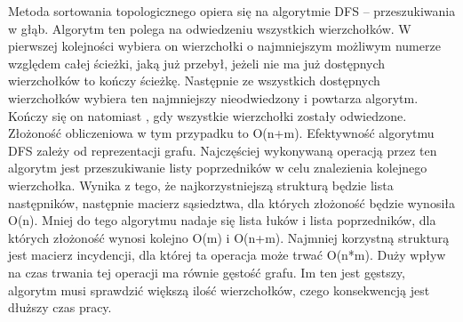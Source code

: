 \documentclass[polish,polish,a4paper]{article}
\begin{document}
\begin{spacing}{1.25}
	\begin{figure}[H]
	
		\centering
	\end{figure}

		
Metoda sortowania topologicznego opiera się na algorytmie DFS – przeszukiwania w głąb. Algorytm ten polega na odwiedzeniu wszystkich wierzchołków. W pierwszej kolejności wybiera on wierzchołki o najmniejszym możliwym numerze względem całej ścieżki, jaką już przebył, jeżeli nie ma już dostępnych wierzchołków to kończy ścieżkę. Następnie ze wszystkich dostępnych wierzchołków wybiera ten najmniejszy nieodwiedzony i powtarza algorytm. Kończy się on natomiast , gdy wszystkie wierzchołki zostały odwiedzone. Złożoność obliczeniowa w tym przypadku to O(n+m). Efektywność algorytmu DFS zależy od reprezentacji grafu. Najczęściej wykonywaną operacją przez ten algorytm jest przeszukiwanie listy poprzedników w celu znalezienia kolejnego wierzchołka. Wynika z tego, że najkorzystniejszą strukturą będzie lista następników, następnie macierz sąsiedztwa, dla których złożoność będzie wynosiła O(n). Mniej do tego algorytmu nadaje się lista łuków i lista poprzedników, dla których złożoność wynosi kolejno O(m) i O(n+m). Najmniej korzystną strukturą jest macierz incydencji, dla której ta operacja może trwać O(n*m). Duży wpływ na czas trwania tej operacji ma równie gęstość grafu. Im ten jest gęstszy, algorytm musi sprawdzić większą ilość wierzchołków, czego konsekwencją jest dłuższy czas pracy.
	

\end{spacing}
\end{document}
